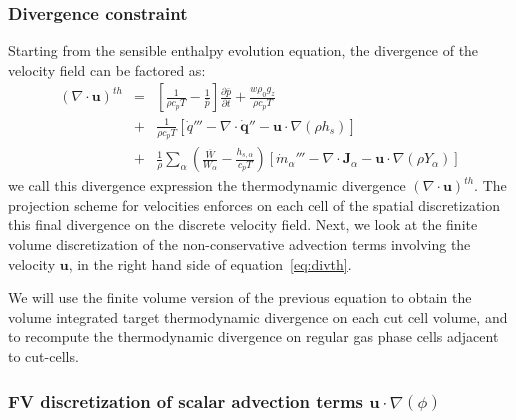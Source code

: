 \documentclass[12pt]{article}
\begin{document}
\subsubsection{Divergence constraint}

Starting from the sensible enthalpy evolution equation, the divergence of the velocity field can be factored as:
%
\begin{eqnarray}
    ( \nabla \cdot \mathbf{u} )^{th} &=&
    \left[ \frac{1}{\rho c_p T} - \frac{1}{\bar{p}} \right]
    \frac{\partial \bar{p}}{\partial t} + \frac{w \rho_0 g_z}{\rho c_p T} \nonumber \\
    &+& \frac{1}{\rho c_p T} \left[ \dot{q}''' - \nabla \cdot \dot{\mathbf{q}}'' - \mathbf{u} \cdot \nabla (\rho h_s) \right] \nonumber \\
    &+& \frac{1}{\rho} \sum_\alpha \left( \frac{\overline{W}}{W_\alpha} - \frac{h_{s,\alpha}}{c_p T} \right) \left[ \dot{m}_\alpha''' - \nabla \cdot \mathbf{J}_\alpha - \mathbf{u} \cdot \nabla (\rho Y_\alpha) \right] \label{eq:divth}
\end{eqnarray}
%
we call this divergence expression the thermodynamic divergence $( \nabla \cdot \mathbf{u} )^{th}$. The projection scheme for velocities enforces on each cell of the spatial discretization this final divergence on the discrete velocity field.
Next, we look at the finite volume discretization of the non-conservative advection terms involving the velocity $\mathbf{u}$, in the right hand side of equation~\eqref{eq:divth}.

We will use the finite volume version of the previous equation to obtain the volume integrated target thermodynamic divergence on each cut cell volume, and to recompute the thermodynamic divergence on regular gas phase cells adjacent to cut-cells.


\subsubsection{FV discretization of scalar advection terms $\mathbf{u} \cdot \nabla (\phi)$}
\end{document}

